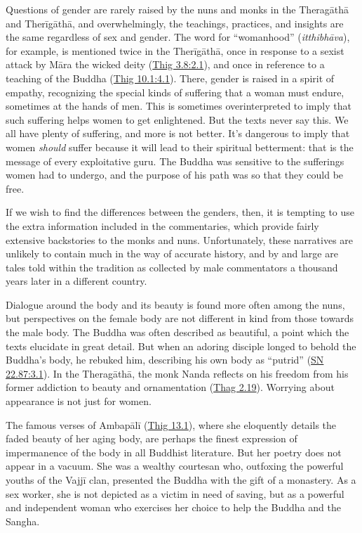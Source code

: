 \documentclass[12pt,openany]{book}%
\begin{document}
Questions of gender are rarely raised by the nuns and monks in the \textsanskrit{Theragāthā} and \textsanskrit{Therīgāthā}, and overwhelmingly, the teachings, practices, and insights are the same regardless of sex and gender. The word for “womanhood” (\textit{\textsanskrit{itthibhāva}}), for example, is mentioned twice in the \textsanskrit{Therīgāthā}, once in response to a sexist attack by \textsanskrit{Māra} the wicked deity (\href{https://suttacentral.net/thig3.8/en/sujato\#2.1}{Thig 3.8:2.1}), and once in reference to a teaching of the Buddha (\href{https://suttacentral.net/thig10.1/en/sujato\#4.1}{Thig 10.1:4.1}). There, gender is raised in a spirit of empathy, recognizing the special kinds of suffering that a woman must endure, sometimes at the hands of men. This is sometimes overinterpreted to imply that such suffering helps women to get enlightened. But the texts never say this. We all have plenty of suffering, and more is not better. It’s dangerous to imply that women \emph{should} suffer because it will lead to their spiritual betterment: that is the message of every exploitative guru. The Buddha was sensitive to the sufferings women had to undergo, and the purpose of his path was so that they could be free.

If we wish to find the differences between the genders, then, it is tempting to use the extra information included in the commentaries, which provide fairly extensive backstories to the monks and nuns. Unfortunately, these narratives are unlikely to contain much in the way of accurate history, and by and large are tales told within the tradition as collected by male commentators a thousand years later in a different country.

Dialogue around the body and its beauty is found more often among the nuns, but perspectives on the female body are not different in kind from those towards the male body. The Buddha was often described as beautiful, a point which the texts elucidate in great detail. But when an adoring disciple longed to behold the Buddha’s body, he rebuked him, describing his own body as “putrid” (\href{https://suttacentral.net/sn22.87/en/sujato\#3.1}{SN 22.87:3.1}). In the \textsanskrit{Theragāthā}, the monk Nanda reflects on his freedom from his former addiction to beauty and ornamentation (\href{https://suttacentral.net/thag2.19}{Thag 2.19}). Worrying about appearance is not just for women.

The famous verses of \textsanskrit{Ambapālī} (\href{https://suttacentral.net/thig13.1/en/sujato}{Thig 13.1}), where she eloquently details the faded beauty of her aging body, are perhaps the finest expression of impermanence of the body in all Buddhist literature. But her poetry does not appear in a vacuum. She was a wealthy courtesan who, outfoxing the powerful youths of the \textsanskrit{Vajjī} clan, presented the Buddha with the gift of a monastery. As a sex worker, she is not depicted as a victim in need of saving, but as a powerful and independent woman who exercises her choice to help the Buddha and the Sangha. 
\end{document}
